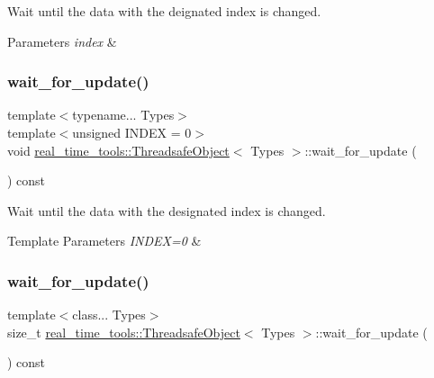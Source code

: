 Wait until the data with the deignated index is changed. 


\begin{DoxyParams}{Parameters}
{\em index} & \\
\hline
\end{DoxyParams}
\mbox{\label{classreal__time__tools_1_1ThreadsafeObject_a2b1cc6a7d2691e8266130701975fd1f1}} 
\subsubsection{\texorpdfstring{wait\+\_\+for\+\_\+update()}{wait\_for\_update()}\hspace{0.1cm}{\footnotesize\ttfamily [2/3]}}
{\footnotesize\ttfamily template$<$typename... Types$>$ \\
template$<$unsigned I\+N\+D\+EX = 0$>$ \\
void \hyperlink{classreal__time__tools_1_1ThreadsafeObject}{real\+\_\+time\+\_\+tools\+::\+Threadsafe\+Object}$<$ Types $>$\+::wait\+\_\+for\+\_\+update (\begin{DoxyParamCaption}{ }\end{DoxyParamCaption}) const\hspace{0.3cm}{\ttfamily [inline]}}



Wait until the data with the designated index is changed. 


\begin{DoxyTemplParams}{Template Parameters}
{\em I\+N\+D\+E\+X=0} & \\
\hline
\end{DoxyTemplParams}
\mbox{\label{classreal__time__tools_1_1ThreadsafeObject_a16807abf31871861f2fc3e228ecda18f}} 
\subsubsection{\texorpdfstring{wait\+\_\+for\+\_\+update()}{wait\_for\_update()}\hspace{0.1cm}{\footnotesize\ttfamily [3/3]}}
{\footnotesize\ttfamily template$<$class... Types$>$ \\
size\+\_\+t \hyperlink{classreal__time__tools_1_1ThreadsafeObject}{real\+\_\+time\+\_\+tools\+::\+Threadsafe\+Object}$<$ Types $>$\+::wait\+\_\+for\+\_\+update (\begin{DoxyParamCaption}{ }\end{DoxyParamCaption}) const}



